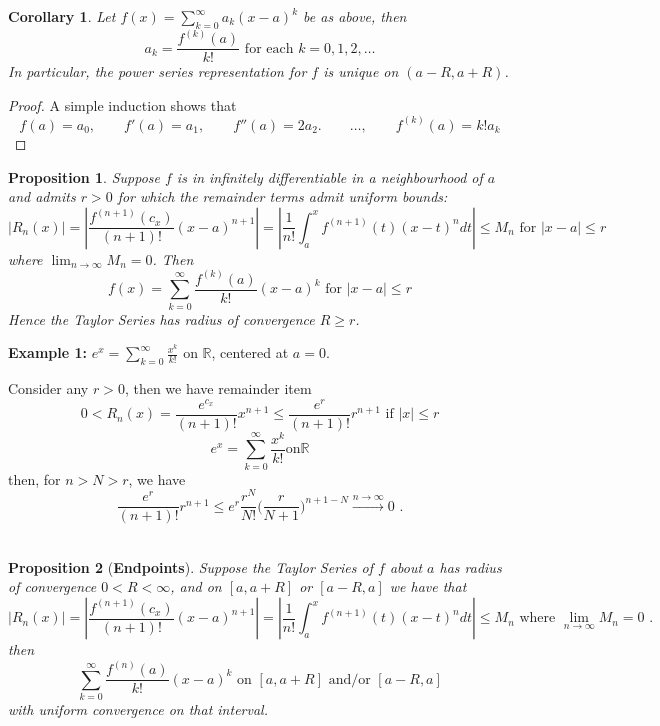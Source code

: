 \documentclass[12pt]{article}
\theoremstyle{plain}
\newtheorem{proposition}{Proposition}[subsection]
\newtheorem{corollary}{Corollary}[subsection]
\newcommand{\abs}[1]{\left| #1 \right|}
\newcommand{\mR}{{\mathbb{R}}}
\begin{document}
\begin{corollary}
	Let $f(x) = \sum_{k=0}^{\infty} a_k (x-a)^k$ be as above, then 
	\[
		a_k = \frac{f^{(k)}(a)}{k!} 
		\text{ for each } k = 0, 1, 2, \ldots 
	\]
	In particular, the power series representation for $f$ is unique on 
	$(a - R, a + R)$. 
\end{corollary}
\begin{proof}
	A simple induction shows that 
	\[
		f(a) = a_0, \qquad f'(a) = a_1, \qquad f''(a) = 2a_2. 
		\qquad 
		\ldots, 
		\qquad 
		f^{(k)}(a) = k!a_k
	\]
\end{proof}


\begin{proposition}
	Suppose $f$ is in infinitely differentiable in a neighbourhood of $a$ and
	admits $r > 0$ for which the remainder terms admit uniform bounds:
	\[
		\abs{R_n(x)} 
		= \abs{\frac{f^{(n+1)}(c_x)}{(n+1)!} (x-a)^{n+1}}
		= \abs{\frac 1{n!} \int_a^x f^{(n+1)} (t) (x-t)^n dt}
		\leq M_n
		\text{ for } 
		\abs{x-a} \leq r
	\]
	where $\lim_{n\to\infty} M_n = 0$. Then 
	\[
		f(x) = \sum_{k=0}^{\infty} \frac{f^{(k)}(a)}{k!} (x-a)^k
		\text{ for } \abs{x-a} \leq r
	\]
	Hence the Taylor Series has radius of convergence $R \geq r$. 
\end{proposition}





{\color{Brown}

	\textbf{Example 1:} $e^x = \sum_{k=0}^{\infty} \frac{x^k}{k!}$ on $\mR$,
	centered at $a=0$.  
	
	Consider any $r > 0$, then we have remainder item 
	\[
		0 < R_n(x) = \frac{e^{c_x}}{(n+1)!} x^{n+1} 
		\leq \frac{e^r}{(n+1)!} r^{n+1} 
		\text{ if } 
		\abs{x} \leq r 
	\]
\[
	e^x = \sum_{k=0}^{\infty} \frac{x^k}{k!} \text{on} \mR 
\]
then, for $n > N > r$, we have
\[
	\frac{e^r}{(n+1)!} r^{n+1} \leq e^r \frac{r^N}{N!}\bigg(\frac r{N+1}\bigg)
	^{n+1-N} 
	\overset{n\to\infty}{\longrightarrow} 0 \,\, .
\]
\\
}



\begin{proposition}[\textbf{Endpoints}] 
	Suppose the Taylor Series of $f$ about $a$ has radius of convergence
	$0 < R < \infty$, and on $[a, a+R]$ or $[a-R, a]$ we have that 
	\[
		\abs{R_n(x)} = \abs{\frac{f^{(n+1)}(c_x)}{(n+1)!} (x-a)^{n+1}}
		= \abs{\frac1{n!} \int_a^x f^{(n+1)}(t)(x-t)^n dt} \leq M_n
		\text{ where } \lim_{n\to\infty} M_n = 0\,\, .
	\]
	then 
	\[
		\sum_{k=0}^{\infty} \frac{f^{(n)}(a)}{k!} (x-a)^k 
		\text{ on } [a, a + R] \text{ and/or } 
		[a - R , a] 
	\]
	with uniform convergence on that interval. 
\end{proposition}
\end{document}
